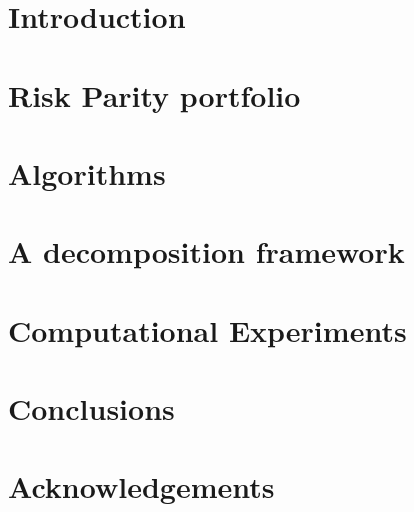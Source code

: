 \documentclass[11pt, titlepage, oneside]{book}
\numberwithin{equation}{section}
\begin{document}
\begin{titlepage}

\end{titlepage} 

\tableofcontents\clearpage

\chapter{Introduction}


\chapter{Risk Parity portfolio}


\chapter{Algorithms}


\chapter{A decomposition framework}


\chapter{Computational Experiments}


\chapter{Conclusions}


\chapter{Acknowledgements}
\clearpage

\begin{thebibliography}{9}

\end{thebibliography}
\end{document}

